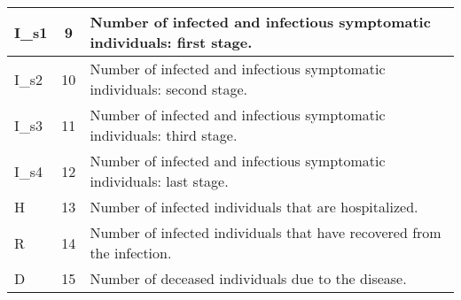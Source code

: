\begin{table}[htb!]
{\begin{tabular}{|l|c|p{9.25cm}|}
            \hline
            I\_s1       & 9                & Number of infected and infectious symptomatic individuals: first stage.                                     \\
            \hline
            I\_s2       & 10               & Number of infected and infectious symptomatic individuals: second stage.                                    \\
            \hline
            I\_s3       & 11               & Number of infected and infectious symptomatic individuals: third stage.                                     \\
            \hline
            I\_s4       & 12               & Number of infected and infectious symptomatic individuals: last stage.                                      \\
            \hline
            H           & 13               & Number of infected individuals that are hospitalized.                                                       \\
            \hline
            R           & 14               & Number of infected individuals that have recovered from the infection.                                      \\
            \hline
            D           & 15               & Number of deceased individuals due to the disease.                                                          \\
            \hline
        \end{tabular}%
    }
\end{table}

\begin{table}[htb!]
    \centering
    \caption{Description of output parameters.}
    \label{tab:outparams}
\end{table}

